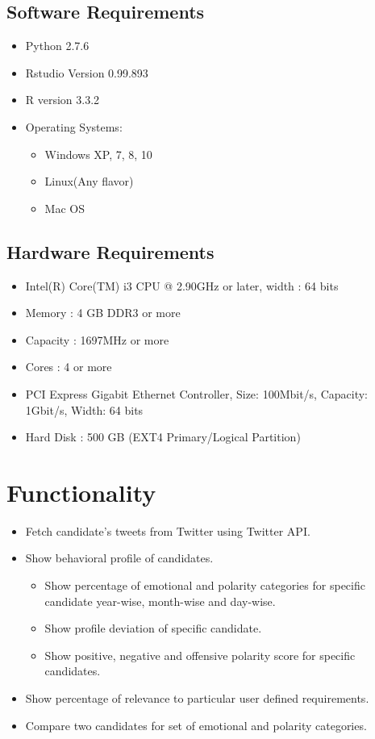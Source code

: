 \documentclass[oneside,a4paper,12pt]{pictreport}
\begin{document}
\subsection{Software Requirements}
\begin{itemize}
				\item Python 2.7.6 
				\item Rstudio Version 0.99.893 
				\item R version 3.3.2
				\item Operating Systems:
					\begin{itemize}
						\item Windows XP, 7, 8, 10
						\item Linux(Any flavor)
						\item Mac OS 
					\end{itemize}
\end{itemize}
\subsection{Hardware Requirements}
			\begin{itemize}
				\item Intel(R) Core(TM) i3 CPU @ 2.90GHz or later, width : 64 bits
				\item Memory : 4 GB DDR3 or more
				\item Capacity : 1697MHz or more
				\item Cores : 4 or more
				\item PCI Express Gigabit Ethernet Controller, Size: 100Mbit/s, Capacity: 1Gbit/s, Width: 64 bits
				\item Hard Disk : 500 GB (EXT4 Primary/Logical Partition)
			\end{itemize}
		
\newpage

\section{Functionality}
\begin{itemize}
\item Fetch candidate's tweets from Twitter using Twitter API.
\item Show behavioral profile of candidates.
\begin{itemize}
\item Show percentage of emotional and polarity categories for specific candidate year-wise, month-wise and day-wise.
\item Show profile deviation of specific candidate.
\item Show positive, negative and offensive polarity score for specific candidates.
\end{itemize}
\item Show percentage of relevance to particular user defined requirements.
\item Compare two candidates for set of emotional and polarity categories.
\end{itemize} 
\end{document}
